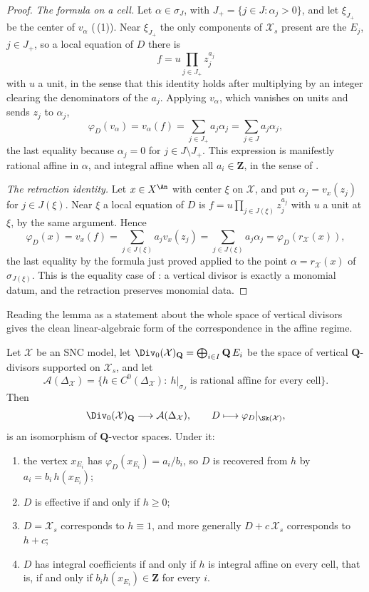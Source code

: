 \begin{proof}
\emph{The formula on a cell.} Let $\alpha\in\sigma_J$, with
$J_+=\{j\in J:\alpha_j>0\}$, and let $\xi_{J_+}$ be the center of
$v_\alpha$ (\,(1)). Near
$\xi_{J_+}$ the only components of $\mathcal X_s$ present are the
$E_j$, $j\in J_+$, so a local equation of $D$ there is
\[
 f=u\prod_{j\in J_+}z_j^{a_j}
\]
with $u$ a unit, in the sense that this identity holds after multiplying
by an integer clearing the denominators of the $a_j$. Applying
$v_\alpha$, which vanishes on units and sends $z_j$ to $\alpha_j$,
\[
 \varphi_D(v_\alpha)=v_\alpha(f)
 =\sum_{j\in J_+}a_j\alpha_j
 =\sum_{j\in J}a_j\alpha_j,
\]
the last equality because $\alpha_j=0$ for $j\in J\setminus J_+$. This
expression is manifestly rational affine in $\alpha$, and integral affine
when all $a_i\in\mathbf Z$, in the sense of
.

\emph{The retraction identity.} Let $x\in X^{\An}$ with center $\xi$ on
$\mathcal X$, and put $\alpha_j=v_x(z_j)$ for $j\in J(\xi)$. Near
$\xi$ a local equation of $D$ is $f=u\prod_{j\in J(\xi)}z_j^{a_j}$
with $u$ a unit at $\xi$, by the same argument. Hence
\[
 \varphi_D(x)=v_x(f)=\sum_{j\in J(\xi)}a_jv_x(z_j)
 =\sum_{j\in J(\xi)}a_j\alpha_j
 =\varphi_D(r_{\mathcal X}(x)),
\]
the last equality by the formula just proved applied to the point
$\alpha=r_{\mathcal X}(x)$ of $\sigma_{J(\xi)}$. This is the equality
case of : a vertical divisor is exactly a
monomial datum, and the retraction preserves monomial data.
\end{proof}

Reading the lemma as a statement about the whole space of vertical divisors
gives the clean linear-algebraic form of the correspondence in the affine
regime.

\begin{proposition}
\label{prop:vertical-divisor-affine-iso}
Let $\mathcal X$ be an SNC model, let
$\Div_0(\mathcal X)_{\mathbf Q}=\bigoplus_{i\in I}\mathbf Q\,E_i$ be the
space of vertical $\mathbf Q$-divisors supported on $\mathcal X_s$, and
let
\[
 \mathcal A(\Delta_{\mathcal X})
 =\{h\in C^0(\Delta_{\mathcal X}):\ h|_{\sigma_J}
      \text{ is rational affine for every cell}\}.
\]
Then
\[
 \Div_0(\mathcal X)_{\mathbf Q}\longrightarrow
 \mathcal A(\Delta_{\mathcal X}),
 \qquad D\longmapsto\varphi_D|_{\Sk(\mathcal X)},
\]
is an isomorphism of $\mathbf Q$-vector spaces. Under it:
\begin{enumerate}
\item the vertex $x_{E_i}$ has $\varphi_D(x_{E_i})=a_i/b_i$, so
  $D$ is recovered from $h$ by $a_i=b_i\,h(x_{E_i})$;
\item $D$ is effective if and only if $h\ge0$;
\item $D=\mathcal X_s$ corresponds to $h\equiv1$, and more generally
  $D+c\,\mathcal X_s$ corresponds to $h+c$;
\item $D$ has integral coefficients if and only if $h$ is integral
  affine on every cell, that is, if and only if $b_ih(x_{E_i})\in\mathbf Z$
  for every $i$.
\end{enumerate}
\end{proposition}

